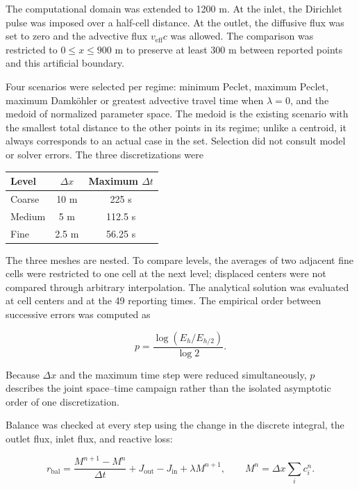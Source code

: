 \documentclass[11pt,a4paper]{article}
\begin{document}
The computational domain was extended to 1200 m. At the inlet, the Dirichlet
pulse was imposed over a half-cell distance. At the outlet, the diffusive flux
was set to zero and the advective flux $v_{\mathrm{eff}}c$ was allowed. The
comparison was restricted to $0\leq x\leq900$ m to preserve at least 300 m
between reported points and this artificial boundary.

Four scenarios were selected per regime: minimum Peclet, maximum Peclet,
maximum Damköhler or greatest advective travel time when $\lambda=0$, and the
medoid of normalized parameter space. The medoid is the existing scenario with
the smallest total distance to the other points in its regime; unlike a
centroid, it always corresponds to an actual case in the set. Selection did not
consult model or solver errors. The three discretizations were

\begin{center}
\begin{tabular}{@{}lcc@{}}
\toprule
Level & $\Delta x$ & Maximum $\Delta t$ \\
\midrule
Coarse & 10 m & 225 s \\
Medium & 5 m & 112.5 s \\
Fine & 2.5 m & 56.25 s \\
\bottomrule
\end{tabular}
\end{center}

The three meshes are nested. To compare levels, the averages of two adjacent
fine cells were restricted to one cell at the next level; displaced centers
were not compared through arbitrary interpolation. The analytical solution was
evaluated at cell centers and at the 49 reporting times. The empirical order
between successive errors was computed as

\begin{equation}
p=\frac{\log(E_h/E_{h/2})}{\log 2}.
\label{eq:observed-order}
\end{equation}

Because $\Delta x$ and the maximum time step were reduced simultaneously, $p$
describes the joint space--time campaign rather than the isolated asymptotic
order of one discretization.

Balance was checked at every step using the change in the discrete integral,
the outlet flux, inlet flux, and reactive loss:

\begin{equation}
r_{\mathrm{bal}}=
\frac{M^{n+1}-M^n}{\Delta t}
+J_{\mathrm{out}}-J_{\mathrm{in}}+\lambda M^{n+1},
\qquad M^n=\Delta x\sum_i c_i^n.
\label{eq:mass-balance}
\end{equation}
\end{document}
